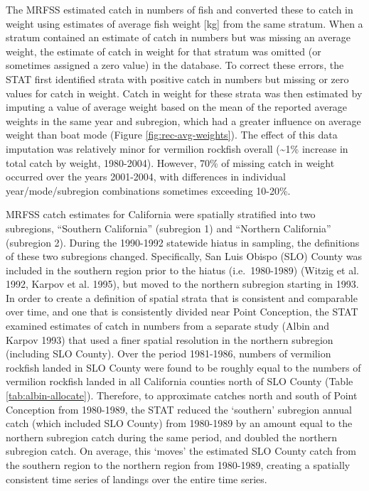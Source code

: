 \documentclass[
  english,
  a4paper,
]{article}
\begin{document}
The MRFSS estimated catch in numbers of fish and converted these to catch in
weight using estimates of average fish weight {[}kg{]} from the same stratum. When
a stratum contained an estimate of catch in numbers but was missing an average
weight, the estimate of catch in weight for that stratum was omitted (or sometimes
assigned a zero value) in the database. To correct these errors, the STAT first
identified strata with positive catch in numbers but missing or zero values for
catch in weight. Catch in weight for these strata was then estimated by imputing
a value of average weight based on the mean of the reported average weights in
the same year and subregion, which had a greater influence on average
weight than boat mode (Figure \ref{fig:rec-avg-weights}). The effect of this data imputation was relatively
minor for vermilion rockfish overall (\textasciitilde1\% increase in total catch by weight,
1980-2004). However, 70\% of missing catch in weight occurred over the years
2001-2004, with differences in individual year/mode/subregion combinations sometimes exceeding 10-20\%.

MRFSS catch estimates for California were spatially stratified into two subregions,
``Southern California'' (subregion 1) and ``Northern California'' (subregion 2).
During the 1990-1992 statewide hiatus in sampling, the definitions of these two
subregions changed. Specifically, San Luis Obispo (SLO) County was included in
the southern region prior to the hiatus (i.e.~1980-1989) (Witzig et al. 1992, Karpov et al. 1995),
but moved to the northern subregion starting in 1993. In order to create a
definition of spatial strata that is consistent and comparable over time, and
one that is consistently divided near Point Conception, the STAT examined
estimates of catch in numbers from a separate study (Albin and Karpov 1993) that used a finer spatial
resolution in the northern subregion (including SLO County). Over the period
1981-1986, numbers of vermilion rockfish landed in SLO County were found to
be roughly equal to the numbers of vermilion rockfish landed in all California
counties north of SLO County (Table \ref{tab:albin-allocate}). Therefore, to approximate catches north and south of Point Conception from 1980-1989, the STAT reduced the `southern' subregion annual catch (which included SLO County) from 1980-1989 by an amount
equal to the northern subregion catch during the same period, and doubled the
northern subregion catch. On average, this `moves' the estimated SLO County
catch from the southern region to the northern region from 1980-1989, creating
a spatially consistent time series of landings over the entire time series.
\end{document}
